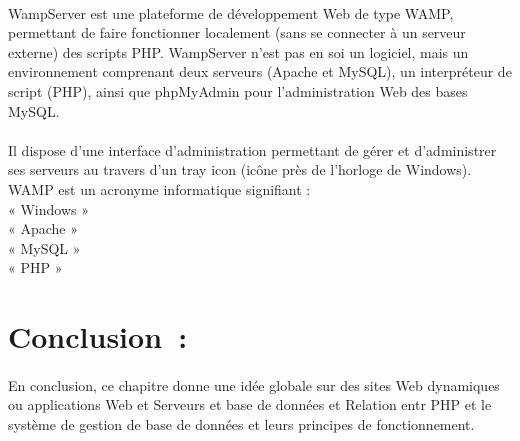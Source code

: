 \paragraph{}
WampServer est une plateforme de développement Web de type WAMP, permettant de faire fonctionner localement (sans se connecter à un serveur externe) des scripts PHP. WampServer n'est pas en soi un logiciel, mais un environnement comprenant deux serveurs (Apache et MySQL), un interpréteur de script (PHP), ainsi que phpMyAdmin pour l'administration Web des bases MySQL.
\paragraph{}
Il dispose d'une interface d'administration permettant de gérer et d'administrer ses serveurs au travers d'un tray icon (icône près de l'horloge de Windows).\\
WAMP est un acronyme informatique signifiant :\\
\textbullet « Windows »\\
\textbullet « Apache »\\
\textbullet « MySQL »\\
\textbullet « PHP »\\

\section{Conclusion :}
\paragraph{}
En conclusion, ce chapitre donne une idée globale sur des sites Web dynamiques ou applications Web et Serveurs et base de données et Relation entr PHP et le système de gestion de base de données et leurs principes de fonctionnement.
